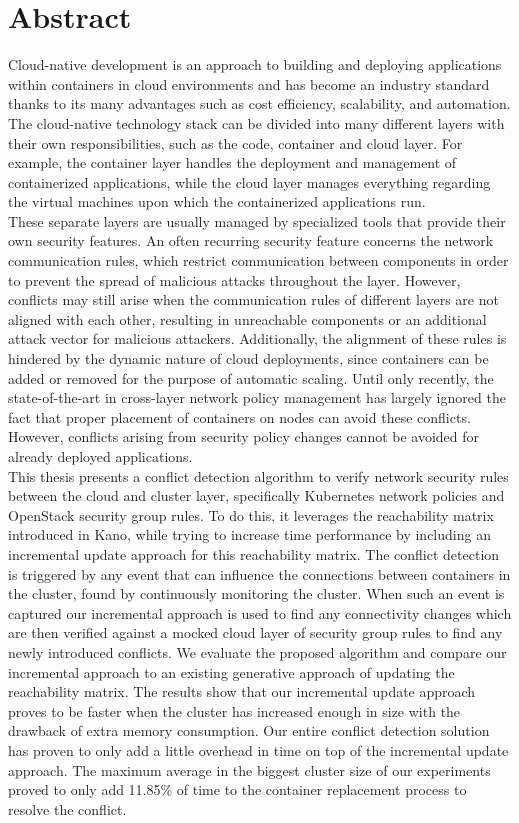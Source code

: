\chapter{Abstract} \label{ch:abstract}
Cloud-native development is an approach to building and deploying applications within containers in cloud environments and has become an industry standard thanks to its many advantages such as cost efficiency, scalability, and automation. The cloud-native technology stack can be divided into many different layers with their own responsibilities, such as the code, container and cloud layer. For example, the container layer handles the deployment and management of containerized applications, while the cloud layer manages everything regarding the virtual machines upon which the containerized applications run. 
\\[10pt]

These separate layers are usually managed by specialized tools that provide their own security features. An often recurring security feature concerns the network communication rules, which restrict communication between components in order to prevent the spread of malicious attacks throughout the layer. However, conflicts may still arise when the communication rules of different layers are not aligned with each other, resulting in unreachable components or an additional attack vector for malicious attackers. Additionally, the alignment of these rules is hindered by the dynamic nature of cloud deployments, since containers can be added or removed for the purpose of automatic scaling. Until only recently, the state-of-the-art in cross-layer network policy management has largely ignored the fact that proper placement of containers on nodes can avoid these conflicts. However, conflicts arising from security policy changes cannot be avoided for already deployed applications.
\\[10pt]

This thesis presents a conflict detection algorithm to verify network security rules between the cloud and cluster layer, specifically Kubernetes network policies and OpenStack security group rules. To do this, it leverages the reachability matrix introduced in Kano, while trying to increase time performance by including an incremental update approach for this reachability matrix. The conflict detection is triggered by any event that can influence the connections between containers in the cluster, found by continuously monitoring the cluster. When such an event is captured our incremental approach is used to find any connectivity changes which are then verified against a mocked cloud layer of security group rules to find any newly introduced conflicts. We evaluate the proposed algorithm and compare our incremental approach to an existing generative approach of updating the reachability matrix. The results show that our incremental update approach proves to be faster when the cluster has increased enough in size with the drawback of extra memory consumption. Our entire conflict detection solution has proven to only add a little overhead in time on top of the incremental update approach. The maximum average in the biggest cluster size of our experiments proved to only add 11.85\% of time to the container replacement process to resolve the conflict.
\cleardoublepage

